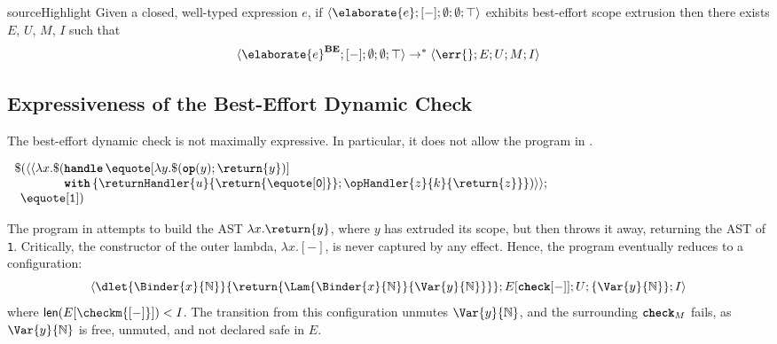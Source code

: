 \begin{theorem}{sourceHighlight} Given a closed, well-typed \sourceLang{} expression $e$, if  $\langle \elaborate{e}; [-]; \emptyset; \emptyset; \top \rangle$ exhibits best-effort scope extrusion 
then there exists $E$, $U$, $M$, $I$ such that \[\langle \elaborate{e}^{\textbf{BE}}; [-]; \emptyset; \emptyset; \top \rangle \to^{*}\langle \err{}; E; U; M; I \rangle\]
\end{theorem}

\subsection{Expressiveness of the Best-Effort Dynamic Check}\label{subsection:best-effort-expressive}
The best-effort dynamic check is not maximally expressive. In particular, it does not allow the program in . 

\begin{code}
  \begin{source}
    $
    \begin{array}{l}
      \$(\langle \langle \lambda x. \$ (\textbf{\texttt{handle}} \, \equote[{\lambda y. \$(\textbf{\texttt{op}}(y); \return{y})}]\\
      \quad\quad\quad\quad\textbf{\texttt{with}} \, \{ \returnHandler{u}{\return{\equote[\texttt{0}]}}; \opHandler{z}{k}{\return{z}}\})\rangle\rangle;\\
      \;\, \equote[{\texttt{1}}])
    \end{array}
    $
  \end{source}
  \label{listing:best-effort-imperfect}
\end{code}

The program in  attempts to build the AST $\lambda x.\return{y}$, where $y$ has extruded its scope, but then throws it away, returning the AST of \texttt{1}. Critically, the constructor of the outer lambda, $\lambda x. [-]$, is never captured by any effect. Hence, the program eventually reduces to a configuration: 
\[\langle \dlet{\Binder{x}{\mathbb{N}}}{\return{\Lam{\Binder{x}{\mathbb{N}}}{\Var{y}{\mathbb{N}}}}}; E[\textbf{\texttt{check}}[-]]; U; \{\Var{y}{\mathbb{N}}\} ; I \rangle\]
where $\textsf{len}(E[\checkm{[-]}]) < I$. The transition from this configuration unmutes $\Var{y}{\mathbb{N}}$, and the surrounding $\textbf{\texttt{check}}_M$ fails, as $\Var{y}{\mathbb{N}}$ is free, unmuted, and not declared safe in $E$.

